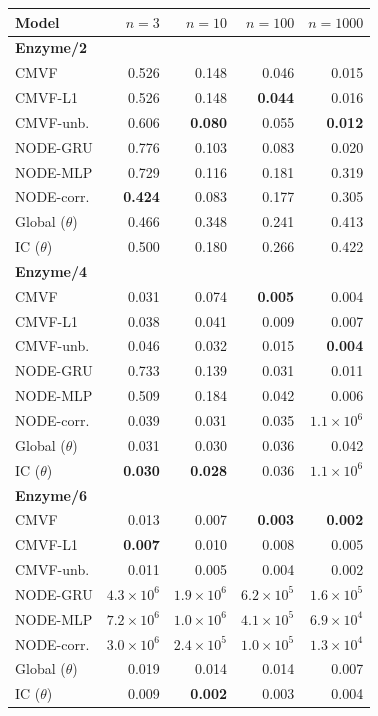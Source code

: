 \begin{tabular*}{\linewidth}{@{\extracolsep{\fill}}lrrrr}
\toprule
Model & $n=3$ & $n=10$ & $n=100$ & $n=1000$ \\
\midrule
\multicolumn{5}{l}{\textbf{Enzyme/2}} \\
CMVF & 0.526 & 0.148 & 0.046 & 0.015 \\
CMVF-L1 & 0.526 & 0.148 & \textbf{0.044} & 0.016 \\
CMVF-unb. & 0.606 & \textbf{0.080} & 0.055 & \textbf{0.012} \\
NODE-GRU & 0.776 & 0.103 & 0.083 & 0.020 \\
NODE-MLP & 0.729 & 0.116 & 0.181 & 0.319 \\
NODE-corr. & \textbf{0.424} & 0.083 & 0.177 & 0.305 \\
Global ($\theta$) & 0.466 & 0.348 & 0.241 & 0.413 \\
IC ($\theta$) & 0.500 & 0.180 & 0.266 & 0.422 \\
\midrule
\multicolumn{5}{l}{\textbf{Enzyme/4}} \\
CMVF & 0.031 & 0.074 & \textbf{0.005} & 0.004 \\
CMVF-L1 & 0.038 & 0.041 & 0.009 & 0.007 \\
CMVF-unb. & 0.046 & 0.032 & 0.015 & \textbf{0.004} \\
NODE-GRU & 0.733 & 0.139 & 0.031 & 0.011 \\
NODE-MLP & 0.509 & 0.184 & 0.042 & 0.006 \\
NODE-corr. & 0.039 & 0.031 & 0.035 & $1.1\!\times\!10^{6}$ \\
Global ($\theta$) & 0.031 & 0.030 & 0.036 & 0.042 \\
IC ($\theta$) & \textbf{0.030} & \textbf{0.028} & 0.036 & $1.1\!\times\!10^{6}$ \\
\midrule
\multicolumn{5}{l}{\textbf{Enzyme/6}} \\
CMVF & 0.013 & 0.007 & \textbf{0.003} & \textbf{0.002} \\
CMVF-L1 & \textbf{0.007} & 0.010 & 0.008 & 0.005 \\
CMVF-unb. & 0.011 & 0.005 & 0.004 & 0.002 \\
NODE-GRU & $4.3\!\times\!10^{6}$ & $1.9\!\times\!10^{6}$ & $6.2\!\times\!10^{5}$ & $1.6\!\times\!10^{5}$ \\
NODE-MLP & $7.2\!\times\!10^{6}$ & $1.0\!\times\!10^{6}$ & $4.1\!\times\!10^{5}$ & $6.9\!\times\!10^{4}$ \\
NODE-corr. & $3.0\!\times\!10^{6}$ & $2.4\!\times\!10^{5}$ & $1.0\!\times\!10^{5}$ & $1.3\!\times\!10^{4}$ \\
Global ($\theta$) & 0.019 & 0.014 & 0.014 & 0.007 \\
IC ($\theta$) & 0.009 & \textbf{0.002} & 0.003 & 0.004 \\
\bottomrule
\end{tabular*}
